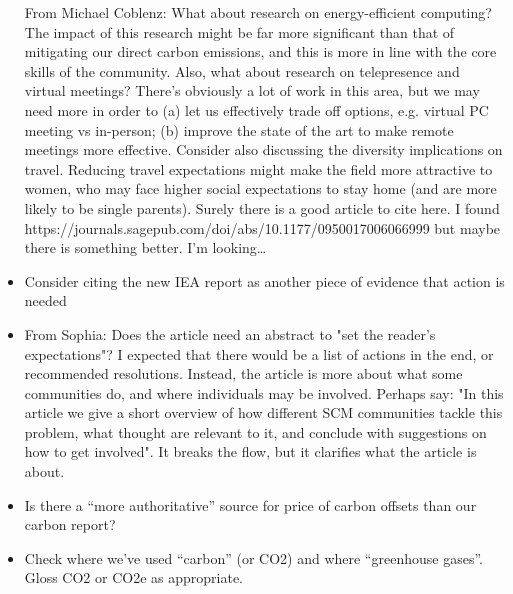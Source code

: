 \documentclass[12pt]{article}
\begin{document}
\begin{itemize}
From Michael Coblenz:
What about research on energy-efficient computing? The impact of this research might be far more significant than that of mitigating our direct carbon emissions, and this is more in line with the core skills of the community.
Also, what about research on telepresence and virtual meetings? There's obviously a lot of work in this area, but we may need more in order to (a) let us effectively trade off options, e.g. virtual PC meeting vs in-person; (b) improve the state of the art to make remote meetings more effective.
Consider also discussing the diversity implications on travel. Reducing travel expectations might make the field more attractive to women, who may face higher social expectations to stay home (and are more likely to be single parents). Surely there is a good article to cite here. I found https://journals.sagepub.com/doi/abs/10.1177/0950017006066999 but maybe there is something better. I'm looking…
\item
Consider citing the new IEA report as another piece of evidence that action is needed
\item
From Sophia: Does the article need an abstract to "set the reader's expectations"? I expected that there would be a list of actions in the end, or recommended resolutions. Instead, the article is more about what some communities do, and where individuals may be involved.  Perhaps say: "In this article we give a short overview of how different SCM communities tackle this problem, what thought are relevant to it, and conclude with suggestions on how to get involved". It breaks the flow, but it clarifies what the article is about.
\item
Is there a ``more authoritative'' source for price of carbon offsets than
our carbon report?
\item
Check where we've used ``carbon'' (or CO2) and where ``greenhouse gases''.  Gloss CO2 or CO2e as appropriate.
\end{itemize}
\fi

\end{document}

